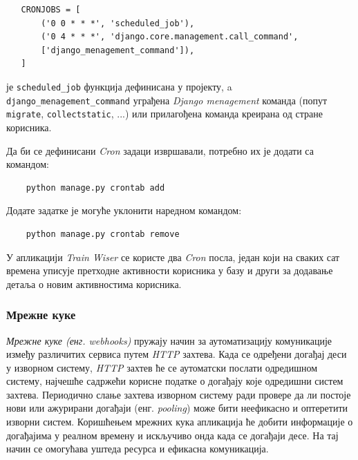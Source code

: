 \documentclass[12pt,oneside]{memoir}
\begin{document}
\begin{lstlisting}
   CRONJOBS = [
       ('0 0 * * *', 'scheduled_job'),
       ('0 4 * * *', 'django.core.management.call_command',
       ['django_menagement_command']),
   ]
\end{lstlisting}

 је \texttt{scheduled\_job} функција дефинисана у пројекту, a \texttt{dјango\_menagement\_command} уграђена \textit{Django menagement} команда (попут
\texttt{migrate}, \texttt{collectstatic}, ...) или прилагођена команда креирана од стране корисника.

Да би се дефинисани \textit{Cron} задаци извршавали, потребно их је додати са командом:

\begin{lstlisting}
    python manage.py crontab add
\end{lstlisting}

Додате задатке је могуће уклонити наредном командом:

\begin{lstlisting}
    python manage.py crontab remove
\end{lstlisting}

У апликацији \textit{Train Wiser} се користе два \textit{Cron} посла, један који на сваких сат времена уписује претходне активности корисника у базу и други за додавање детаља о новим активностима корисника.

\subsubsection{Мрежне куке}

\textit{Мрежне куке (енг. webhooks)} пружају начин за аутоматизацију комуникације између различитих сервиса путем \textit{HTTP} захтева. Када се одређени догађај деси у изворном систему, \textit{HTTP} захтев ће се аутоматски послати одредишном систему, најчешће садржећи корисне податке о догађају које одредишни систем захтева. Периодично слање захтева изворном систему ради провере да ли постоје нови или ажурирани догађаји (енг. \textit{pooling}) може бити неефикасно и оптеретити изворни систем. Коришћењем мрежних кука апликација ће добити информације о догађајима у реалном времену и искључиво онда када се догађаји десе. На тај начин се омогућава уштеда ресурса и ефикасна комуникација. 
\end{document}
